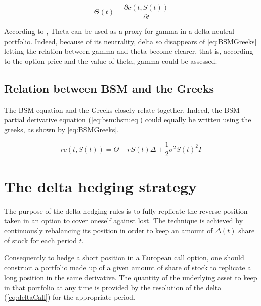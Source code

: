 \documentclass[12pt,a4paper]{report}
\newcommand{\call}[2]{c\left( #1, #2\right)}
\newcommand{\St}{S\left(t\right)}
\newcommand{\BSMGreeks}[1]{r\call{t}{#1} = \Theta + r #1 \Delta + \frac{1}{2} \sigma ^2 #1 ^2 \Gamma}
\begin{document}
\begin{center}
  \begin{equation}
    \Theta (t) = \frac{\partial \call{t}{\St}}{\partial t}
    \label{eq:ThetaDerivative}
  \end{equation}
\end{center}

According to \citet{hull}, Theta can be used as a proxy for gamma in a delta-neutral portfolio.
Indeed, because of its neutrality, delta so disappears of \cref{eq:BSMGreeks} letting the relation between gamma and theta become clearer, that is, according to the option price and the value of theta, gamma could be assessed.


\subsection{Relation between BSM and the Greeks}
\label{sec:BSMGreeks}

The BSM equation and the Greeks closely relate together.
Indeed, the BSM partial derivative equation (\ref{eq:bsm:bsm:eq}) could equally be written using the greeks, as shown by \cref{eq:BSMGreeks}.

\begin{center}
  \begin{equation}
    \BSMGreeks{\St}
    \label{eq:BSMGreeks}
  \end{equation}
\end{center}



\section{The delta hedging strategy}
\label{sec:bsm:delta:hedge}

The purpose of the delta hedging rules is to fully replicate the reverse position taken in an option to cover oneself against lost. The technique is achieved by continuously rebalancing its position in order to keep an amount of $\Delta(t)$ share of stock for each period $t$.

Consequently to hedge a short position in a European call option, one should construct a portfolio made up of a given amount of share of stock to replicate a long position in the same derivative.
The quantity of the underlying asset to keep in that portfolio at any time is provided by the resolution of the delta (\ref{eq:deltaCall}) for the appropriate period.
\end{document}

